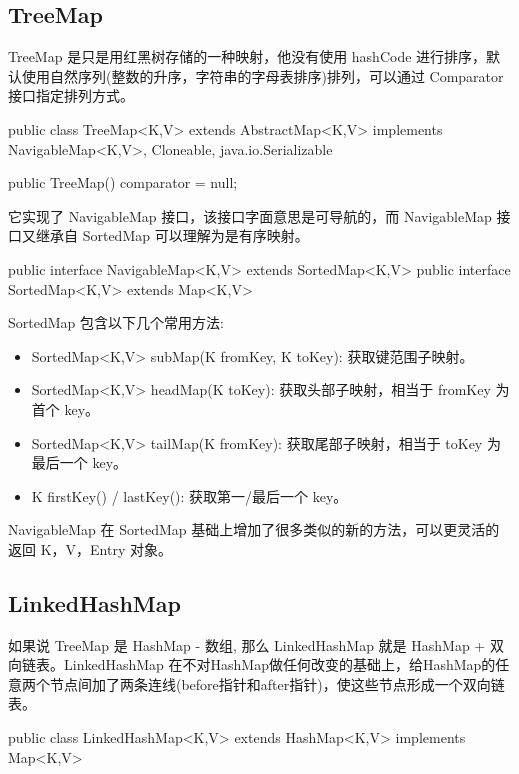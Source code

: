 \subsection{TreeMap}

TreeMap 是只是用红黑树存储的一种映射，他没有使用 hashCode 进行排序，默认使用自然序列(整数的升序，字符串的字母表排序)排列，可以通过 Comparator 接口指定排列方式。

\begin{Java}
public class TreeMap<K,V> extends AbstractMap<K,V> implements NavigableMap<K,V>, Cloneable, java.io.Serializable
\end{Java}

\begin{Java}
public TreeMap() {
    comparator = null;
}
\end{Java}

它实现了 NavigableMap 接口，该接口字面意思是可导航的，而 NavigableMap 接口又继承自 SortedMap 可以理解为是有序映射。

\begin{Java}
public interface NavigableMap<K,V> extends SortedMap<K,V>
public interface SortedMap<K,V> extends Map<K,V>
\end{Java}

SortedMap 包含以下几个常用方法:
\begin{itemize}
    \item SortedMap<K,V> subMap(K fromKey, K toKey): 获取键范围子映射。
    \item SortedMap<K,V> headMap(K toKey): 获取头部子映射，相当于 fromKey 为首个 key。
    \item SortedMap<K,V> tailMap(K fromKey): 获取尾部子映射，相当于 toKey 为最后一个 key。
    \item K firstKey() / lastKey(): 获取第一/最后一个 key。
\end{itemize}

NavigableMap 在 SortedMap 基础上增加了很多类似的新的方法，可以更灵活的返回 K，V，Entry 对象。

\subsection{LinkedHashMap}

如果说 TreeMap 是 HashMap - 数组, 那么 LinkedHashMap 就是 HashMap + 双向链表。LinkedHashMap 在不对HashMap做任何改变的基础上，给HashMap的任意两个节点间加了两条连线(before指针和after指针)，使这些节点形成一个双向链表。

\begin{Java}
public class LinkedHashMap<K,V> extends HashMap<K,V> implements Map<K,V>
\end{Java}

